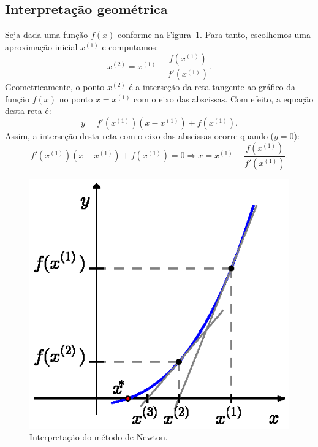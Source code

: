 \subsection{Interpretação geométrica}

Seja dada uma função $f(x)$ conforme na Figura~\ref{fig:metodo_de_Newton}. Para tanto, escolhemos uma aproximação inicial $x^{(1)}$ e computamos:
\begin{equation*}
  x^{(2)} = x^{(1)} - \frac{f(x^{(1)})}{f'(x^{(1)})}.
\end{equation*}
Geometricamente, o ponto $x^{(2)}$ é a interseção da reta tangente ao gráfico da função $f(x)$ no ponto $x = x^{(1)}$ com o eixo das abscissas. Com efeito, a equação desta reta é:
\begin{equation*}
  y = f'(x^{(1)})(x - x^{(1)}) + f(x^{(1)}).
\end{equation*}
Assim, a interseção desta reta com o eixo das abscissas ocorre quando ($y=0$):
\begin{equation*}
  f'(x^{(1)})(x - x^{(1)}) + f(x^{(1)}) = 0\Rightarrow x = x^{(1)} - \frac{f(x^{(1)})}{f'(x^{(1)})}.
\end{equation*}

\begin{figure}[h]
  \centering
  \includegraphics{./cap_equacao1d/pics/metodo_de_Newton/metodo_de_Newton.eps}  
  \caption{Interpretação do método de Newton.}
  \label{fig:metodo_de_Newton}
\end{figure}

